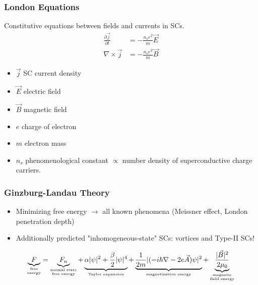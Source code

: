 \documentclass{beamer}
\begin{document}
		\begin{frame}
			\frametitle{London Equations}
			Constitutive equations between fields and currents in SCs. \cite{london}
			\begin{align*}
				\frac{ \partial \vec{j}}{ \partial t} &= -\frac{n_{s}e^2}{m} \vec{E} \\
				\nabla \times \vec{j} &= - \frac{n_{s}e^2}{m}\vec{B}
			\end{align*}
		\begin{multicols}{2}
			\begin{itemize}
				\small
				\item $ \vec{j} $ SC current density
				\item $ \vec{E} $ electric field
				\item $ \vec{B} $ magnetic field
				\item $ e $ charge of electron
				\item $ m $ electron mass
				\item $ n_{s} $ phenomenological constant $ \propto $ number density of superconductive charge carriers.
			\end{itemize}
		\end{multicols}
		\end{frame}
	  \begin{frame}
	    \frametitle{Ginzburg-Landau Theory}
	    \begin{itemize}
	    	\item Minimizing free energy $ \rightarrow $ all known phenomena (Meissner effect, London penetration depth) \cite{ginz_land}
	    	\item Additionally predicted "inhomogeneous-state" SCs: vortices and Type-II SCs!
	    \end{itemize}
	    \vspace{20pt}
	    \[ 
	    \underbrace{F}_{\substack{\text{\tiny free}\\ \text{\tiny energy}}} = \underbrace{F_{n}}_{\substack{\text{\tiny normal state}\\ \text{\tiny free energy}}} + \underbrace{\alpha |\psi|^2 + \frac{\beta}{2}|\psi|^{4}}_{\text{\tiny Taylor expansion}} + \underbrace{\frac{1}{2m}|(-i\hbar\nabla -2e \vec{A})\psi|^2}_{\text{\tiny magnetization energy}} + \underbrace{\frac{|\vec{B}|^2}{2 \mu_{0}}}_{\substack{\text{\tiny magnetic}\\ \text{\tiny field energy}}}
	    \]
	  \end{frame}
	\backupend
\end{document}
